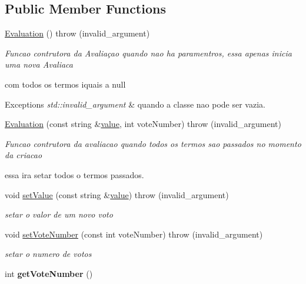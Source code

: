\subsection*{Public Member Functions}
\begin{DoxyCompactItemize}
\item 
\hypertarget{class_evaluation_af7b959b9a214ba6bd0ecc65324d9fe12}{\hyperlink{class_evaluation_af7b959b9a214ba6bd0ecc65324d9fe12}{Evaluation} ()  throw (invalid\-\_\-argument)}\label{class_evaluation_af7b959b9a214ba6bd0ecc65324d9fe12}

\begin{DoxyCompactList}\small\item\em Funcao contrutora da Avaliaçao quando nao ha paramentros, essa apenas inicia uma nova Avaliaca \par
 com todos os termos iquais a null 
\begin{DoxyExceptions}{Exceptions}
{\em std\-::invalid\-\_\-argument} & quando a classe nao pode ser vazia. \\
\hline
\end{DoxyExceptions}
\end{DoxyCompactList}\item 
\hyperlink{class_evaluation_a501dddc6a3042f057dd442adb8553b7e}{Evaluation} (const string \&\hyperlink{class_basic_type_af9b2c5cc32647df01083a6802e913dbf}{value}, int vote\-Number)  throw (invalid\-\_\-argument)
\begin{DoxyCompactList}\small\item\em Funcao contrutora da avaliacao quando todos os termos sao passados no momento da criacao \par
 essa ira setar todos o termos passados. \end{DoxyCompactList}\item 
void \hyperlink{class_evaluation_a9852df114e2c40397b880d9eebf20a46}{set\-Value} (const string \&\hyperlink{class_basic_type_af9b2c5cc32647df01083a6802e913dbf}{value})  throw (invalid\-\_\-argument)
\begin{DoxyCompactList}\small\item\em setar o valor de um novo voto \end{DoxyCompactList}\item 
void \hyperlink{class_evaluation_a4da735c41fa2b62f03b3d16ff6224d53}{set\-Vote\-Number} (const int vote\-Number)  throw (invalid\-\_\-argument)
\begin{DoxyCompactList}\small\item\em setar o numero de votos \end{DoxyCompactList}\item 
\hypertarget{class_evaluation_a359913e2472191b026487f0b9dc59b51}{int {\bfseries get\-Vote\-Number} ()}\label{class_evaluation_a359913e2472191b026487f0b9dc59b51}

\end{DoxyCompactItemize}
